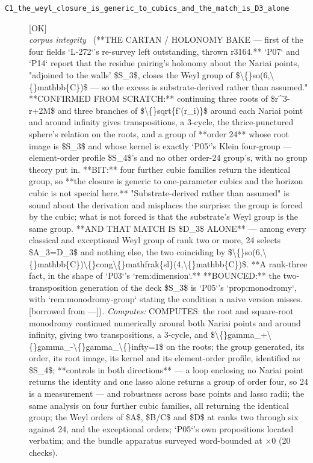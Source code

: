 \begin{description}
\item[\label{rcpt:C1_the_weyl_closure_is_generic_to_cubics_and_the_match_is_D3_alone}\textbf{}\quad\texttt{C1\_the\_weyl\_closure\_is\_generic\_to\_cubics\_and\_the\_match\_is\_D3\_alone}]\hfill\textsf{[OK]}\\
\textit{corpus integrity} \ (**THE CARTAN / HOLONOMY BAKE --- first of the four fields `L-272`'s re-survey left outstanding, thrown r3164.** `P07` and `P14` report that the residue pairing's holonomy about the Nariai points, "adjoined to the walls' \$S\_3\$, closes the Weyl group of \$\textbackslash\{\}so(6,\textbackslash\{\}mathbb\{C\})\$ --- so the excess is substrate-derived rather than assumed." **CONFIRMED FROM SCRATCH:** continuing three roots of \$r\textasciicircum{}3-r+2M\$ and three branches of \$\textbackslash\{\}sqrt\{f'(r\_i)\}\$ around each Nariai point and around infinity gives transpositions, a 3-cycle, the thrice-punctured sphere's relation on the roots, and a group of **order 24** whose root image is \$S\_3\$ and whose kernel is exactly `P05`'s Klein four-group --- element-order profile \$S\_4\$'s and no other order-24 group's, with no group theory put in. **BIT:** four further cubic families return the identical group, so **the closure is generic to one-parameter cubics and the horizon cubic is not special here.** "Substrate-derived rather than assumed" is sound about the derivation and misplaces the surprise: the group is forced by the cubic; what is not forced is that the substrate's Weyl group is the same group. **AND THAT MATCH IS \$D\_3\$ ALONE** --- among every classical and exceptional Weyl group of rank two or more, 24 selects \$A\_3=D\_3\$ and nothing else, the two coinciding by \$\textbackslash\{\}so(6,\textbackslash\{\}mathbb\{C\})\textbackslash\{\}cong\textbackslash\{\}mathfrak\{sl\}(4,\textbackslash\{\}mathbb\{C\})\$. **A rank-three fact, in the shape of `P03`'s `rem:dimension`.** **BOUNCED:** the two-transposition generation of the deck \$S\_3\$ is `P05`'s `prop:monodromy`, with `rem:monodromy-group` stating the condition a naive version misses. [borrowed from ---]). 
\emph{Computes:} COMPUTES: the root and square-root monodromy continued numerically around both Nariai points and around infinity, giving two transpositions, a 3-cycle, and \$\textbackslash\{\}gamma\_+\textbackslash\{\}gamma\_-\textbackslash\{\}gamma\_\textbackslash\{\}infty=1\$ on the roots; the group generated, its order, its root image, its kernel and its element-order profile, identified as \$S\_4\$; **controls in both directions** --- a loop enclosing no Nariai point returns the identity and one lasso alone returns a group of order four, so 24 is a measurement --- and robustness across base points and lasso radii; the same analysis on four further cubic families, all returning the identical group; the Weyl orders of \$A\$, \$B/C\$ and \$D\$ at ranks two through six against 24, and the exceptional orders; `P05`'s own propositions located verbatim; and the bundle apparatus surveyed word-bounded at \ensuremath{\times}0 (20 checks).

\end{description}
